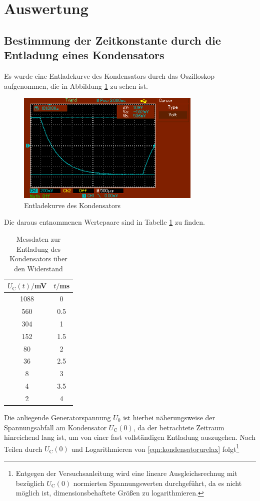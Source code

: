 \section{Auswertung}
\label{sec:Auswertung}
\subsection{Bestimmung der Zeitkonstante durch die Entladung eines Kondensators}
Es wurde eine Entladekurve des Kondensators durch das Oszilloskop aufgenommen, die
in Abbildung \ref{fig:entladekurve} zu sehen ist.
\begin{figure}
  \centering
  \includegraphics[width=250pt]{data/4a_volt.png}
  \caption{Entladekurve des Kondensators}
  \label{fig:entladekurve}
\end{figure}

Die daraus entnommenen Wertepaare sind in Tabelle \ref{tab:entladung} zu finden.

\begin{table}
\centering
\caption{Messdaten zur Entladung des Kondensators über den Widerstand}
\label{tab:entladung}
\begin{tabular}{c c}
\toprule
$U_\text{C}(t)/$mV & $t/$ms \\
\midrule
1088 &  0   \\
 560 &  0.5 \\
 304 &  1   \\
 152 &  1.5 \\
 80  &  2   \\
 36  &  2.5 \\
  8  &  3   \\
  4  &  3.5 \\
  2  &  4   \\
\bottomrule
\end{tabular}
\end{table}
Die anliegende Generatorspannung $U_0$ ist hierbei näherungsweise der Spannungsabfall
am Kondensator $U_\text{C}(0)$, da der betrachtete Zeitraum hinreichend lang ist, um von einer
fast vollständigen Entladung auszugehen.
Nach Teilen durch $U_\text{C}(0)$ und Logarithmieren von \eqref{eqn:kondensatorurelax}
folgt\footnote{Entgegen der Versuchsanleitung wird eine lineare Ausgleichsrechnug mit bezüglich
$U_\text{C}(0)$ normierten Spannungswerten durchgeführt, da es nicht möglich ist,
dimensionsbehaftete Größen zu logarithmieren.}

